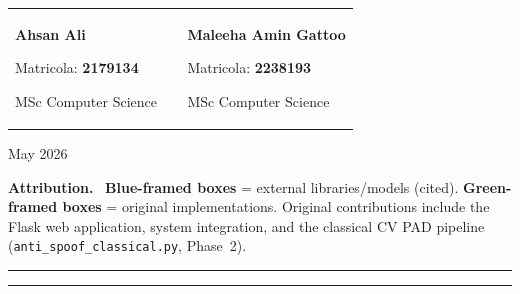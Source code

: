 \documentclass[10pt,a4paper]{article}
\begin{document}
\begin{titlepage}
\vspace{1.0cm}
\begin{tcolorbox}[enhanced,colback=white,colframe=sapblue,boxrule=1.2pt,arc=7pt,
  width=0.85\textwidth,left=0pt,right=0pt,top=0pt,bottom=0pt]
\begin{tabular}{@{}p{0.5\linewidth}@{}p{0.5\linewidth}@{}}
  \begin{tcolorbox}[enhanced,colback=sapblue!5!white,colframe=white,boxrule=0pt,arc=0pt,
    left=12pt,right=6pt,top=12pt,bottom=12pt,
    borderline east={0.5pt}{0pt}{sapblue!30},halign=left]
    {\bfseries Ahsan Ali\par}
    \vspace{4pt}
    {\small\color{darkgray}Matricola: \textbf{2179134}\par}
    {\small\color{darkgray}MSc Computer Science\par}
  \end{tcolorbox}
  &
  \begin{tcolorbox}[enhanced,colback=sapblue!5!white,colframe=white,boxrule=0pt,arc=0pt,
    left=12pt,right=12pt,top=12pt,bottom=12pt,halign=left]
    {\bfseries Maleeha Amin Gattoo\par}
    \vspace{4pt}
    {\small\color{darkgray}Matricola: \textbf{2238193}\par}
    {\small\color{darkgray}MSc Computer Science\par}
  \end{tcolorbox}
\end{tabular}
\end{tcolorbox}

\vspace{0.8cm}
{\small May 2026\par}
\vfill

\begin{tcolorbox}[enhanced,colback=sapblue!4!white,colframe=sapblue,boxrule=1pt,arc=4pt,
  width=\textwidth,left=8pt,right=8pt,top=6pt,bottom=6pt]
\small\textbf{Attribution.}~
\textcolor{sapblue}{\bfseries Blue-framed boxes} = external libraries/models (cited).
\textcolor{codegreen}{\bfseries Green-framed boxes} = original implementations.
Original contributions include the Flask web application, system integration, and the
classical CV PAD pipeline (\texttt{anti\_spoof\_classical.py}, Phase~2).
\end{tcolorbox}

\vspace{0.25cm}
\textcolor{sapblue}{\rule{\textwidth}{0.4pt}}
\vspace{0.08cm}
\textcolor{sapblue}{\rule{\textwidth}{2pt}}
\end{titlepage}
\end{document}
